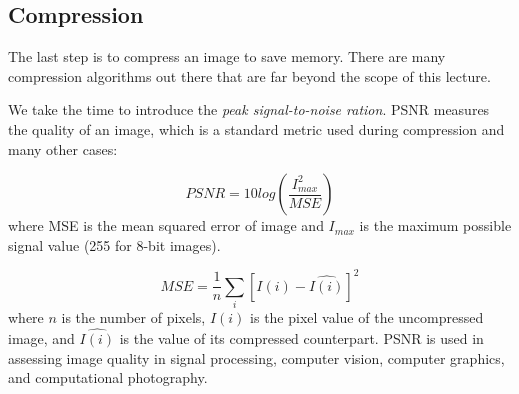 \documentclass{article}
\begin{document}
\subsection{Compression}
The last step is to compress an image to save memory. There are many compression algorithms out there that are far beyond the scope of this lecture.

We take the time to introduce the \textit{peak signal-to-noise ration}. PSNR measures the quality of an image, which is a standard metric used during compression and many other cases:

$$ PSNR = 10log(\frac{I_{max}^2}{MSE})$$
\noindent
where MSE is the mean squared error of image and $I_{max}$ is the maximum possible signal value (255 for 8-bit images). 

$$ MSE = \frac{1}{n}\sum_{i}[I(i)-\hat{I(i)}]^2$$
\noindent
where $n$ is the number of pixels, $I(i)$ is the pixel value of the uncompressed image, and $\hat{I(i)}$ is the value of its compressed counterpart. PSNR is used in assessing image quality in signal processing, computer vision, computer graphics, and computational photography. 
\end{document}
